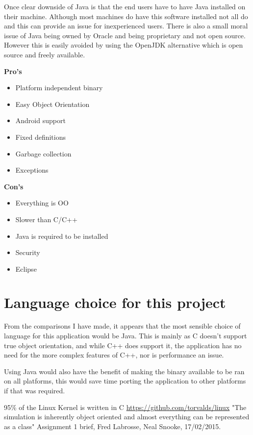 \documentclass[10pt]{article}
\begin{document}
  Once clear downside of Java is that the end users have to have Java installed on their machine. Although most machines do have this software installed not all do and this can provide an issue for inexperienced users. There is also a small moral issue of Java being owned by Oracle and being proprietary and not open source. However this is easily avoided by using the OpenJDK alternative which is open source and freely available.

  \begin{multicols}{2}
  \textbf{Pro's}
  \begin{itemize}
    \item Platform independent binary
    \item Easy Object Orientation
    \item Android support
    \item Fixed definitions
    \item Garbage collection
    \item Exceptions
  \end{itemize}

  \textbf{Con's}
  \begin{itemize}
    \item Everything is OO
    \item Slower than C/C++
    \item Java is required to be installed
    \item Security
    \item Eclipse
  \end{itemize}
  \end{multicols}

  \section{Language choice for this project}
  From the comparisons I have made, it appears that the most sensible choice of language for this application would be Java. This is mainly as C doesn't support true object orientation, and while C++ does support it, the application has no need for the more complex features of C++, nor is performance an issue. 

  Using Java would also have the benefit of making the binary available to be ran on all platforms, this would save time porting the application to other platforms if that was required. 

  
  \begin{thebibliography}{1}
    95\% of the Linux Kernel is written in C \url{https://github.com/torvalds/linux}
    "The simulation is inherently object oriented and almost everything can be represented as a class" Assignment 1 brief, Fred Labrosse, Neal Snooke, 17/02/2015.

  \end{thebibliography}
\end{document}
